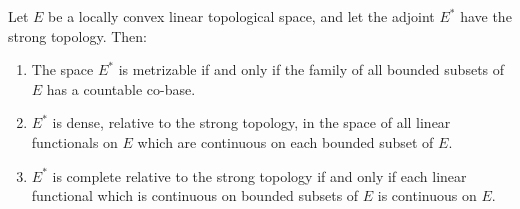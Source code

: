Let $E$ be a locally convex linear topological space, and let the adjoint $E^*$ have the strong topology. Then:

\begin{enumerate}
\item[(i)] The space $E^*$ is metrizable if and only if the family of all bounded subsets of $E$ has a countable co-base.

\item[(ii)] $E^*$ is dense, relative to the strong topology, in the space of all linear functionals on $E$ which are continuous on each bounded subset of $E$.

\item[(iii)] $E^*$ is complete relative to the strong topology if and only if each linear functional which is continuous on bounded subsets of $E$ is continuous on $E$.
\end{enumerate}
